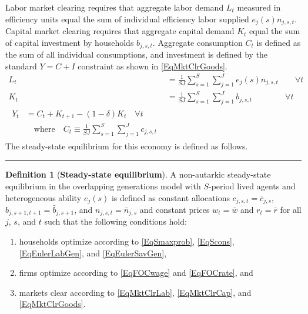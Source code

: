 \documentclass[letterpaper,12pt]{article}
\theoremstyle{definition}
\newtheorem{definition}{Definition} %
\begin{document}
\begin{spacing}{1.5}
    Labor market clearing requires that aggregate labor demand $L_t$ measured in efficiency units equal the sum of individual efficiency labor supplied $e_j(s)n_{j,s,t}$. Capital market clearing requires that aggregate capital demand $K_t$ equal the sum of capital investment by households $b_{j,s,t}$. Aggregate consumption $C_t$ is defined as the sum of all individual consumptions, and investment is defined by the standard $Y = C + I$ constraint as shown in \eqref{EqMktClrGoods}.
    \begin{align}
      L_t &= \frac{1}{SJ}\sum_{s=1}^S\sum_{j=1}^{J} e_j(s)n_{j,s,t} \quad\quad \forall t \label{EqMktClrLab} \\
      K_t &= \frac{1}{SJ}\sum_{s=1}^{S}\sum_{j=1}^{J}b_{j,s,t} \quad\quad\quad\quad \forall t \label{EqMktClrCap} \\
      \begin{split}
        Y_t &= C_t + K_{t+1} - (1-\delta)K_t \quad\forall t \\
        &\quad\text{where}\quad C_t \equiv \frac{1}{SJ}\sum_{s=1}^{S}\sum_{j=1}^{J}c_{j,s,t}
      \end{split} \label{EqMktClrGoods}
    \end{align}
    The steady-state equilibrium for this economy is defined as follows.

    \vspace{7mm}
    \end{spacing}
    \hrule
    \begin{definition}[\textbf{Steady-state equilibrium}]\label{DefEquilSS}
      A non-autarkic steady-state equilibrium in the overlapping generations model with $S$-period lived agents and heterogeneous ability $e_j(s)$ is defined as constant allocations $c_{j,s,t}=\bar{c}_{j,s}$, $b_{j,s+1,t+1}=\bar{b}_{j,s+1}$, and $n_{j,s,t}=\bar{n}_{j,s}$ and constant prices $w_t=\bar{w}$ and $r_t=\bar{r}$ for all $j$, $s$, and $t$ such that the following conditions hold:
       \begin{enumerate}
          \item households optimize according to \eqref{EqSmaxprob}, \eqref{EqScons}, \eqref{EqEulerLabGen}, and \eqref{EqEulerSavGen},
          \item firms optimize according to \eqref{EqFOCwage} and \eqref{EqFOCrate}, and
          \item markets clear according to \eqref{EqMktClrLab}, \eqref{EqMktClrCap}, and \eqref{EqMktClrGoods}.
       \end{enumerate}
    \end{definition}
\end{document}
